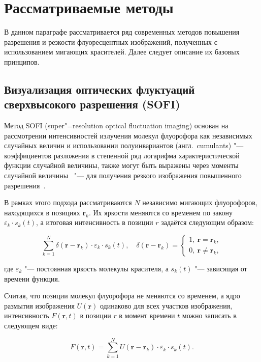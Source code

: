 \section{Рассматриваемые методы}

В данном параграфе рассматривается ряд современных методов повышения разрешения и резкости флуоресцентных изображений, полученных с использованием мигающих красителей. Далее следует описание их базовых принципов.

\subsection{Визуализация оптических флуктуаций сверхвысокого разрешения (SOFI)}

Метод SOFI (super"=resolution optical fluctuation imaging) основан на рассмотрении интенсивностей излучения молекул флуорофора как независимых случайных величин и использовании полуинвариантов (англ.~cumulants) "--- коэффициентов разложения в степенной ряд логарифма характеристической функции случайной величины, также могут быть выражены через моменты случайной величины~\cite{75086, малахов1978кумулянтный} "--- для получения резкого изображения повышенного разрешения~\cite{dertinger2009fast,dertinger2010achieving}.

В рамках этого подхода рассматриваются $N$ независимо мигающих флуорофоров, находящихся в позициях $\mathbf{r}_k$. Их яркости меняются со временем по закону $\varepsilon_k\cdot s_k(t)$, а итоговая интенсивность в позиции $r$ задаётся следующим образом:

\begin{equation}
	\sum_{k=1}^{N}{\delta(\mathbf{r}-\mathbf{r}_k)\cdot\varepsilon_k\cdot s_k(t)}, \quad \delta\left(\mathbf{r}-\mathbf{r}_k\right)=
	\begin{cases}
		1,\ \mathbf{r}=\mathbf{r}_k, \\
		0,\ \mathbf{r}\neq\mathbf{r}_k,
	\end{cases} \nonumber
\end{equation}	

\noindent где $\varepsilon_k$ "--- постоянная яркость молекулы красителя, а $s_k(t)$ "--- зависящая от времени функция.

Считая, что позиции молекул флуорофора не меняются со временем, а ядро размытия изображения $U(\mathbf{r})$ одинаково для всех участков изображения, интенсивность $F(\mathbf{r},t)$ в позиции $r$ в момент времени $t$ можно записать в следующем виде:

\begin{equation}
	F\left(\mathbf{r},t\right)=\sum_{k=1}^{N}{U(\mathbf{r}-\mathbf{r}_k)\cdot\varepsilon_k\cdot s_k(t)}. \nonumber
\end{equation}


